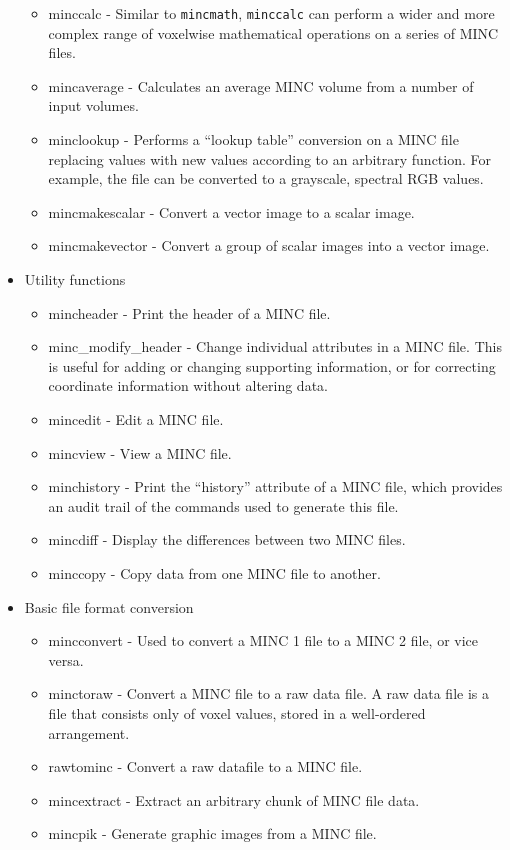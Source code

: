 \documentclass{article}
\begin{document}
\begin{itemize}
\begin{itemize}
\item minccalc - Similar to {\tt mincmath}, {\tt minccalc} can perform
a wider and more complex range of voxelwise mathematical operations
on a series of MINC files.
\item mincaverage - Calculates an average MINC volume from a number of
input volumes.
\item minclookup - Performs a ``lookup table'' conversion on a MINC file
replacing values with new values according to an arbitrary function.
For example, the file can be converted to a grayscale, spectral RGB values.
\item mincmakescalar - Convert a vector image to a scalar image.
\item mincmakevector - Convert a group of scalar images into a vector image.
\end{itemize}
\item Utility functions
\begin{itemize}
\item mincheader - Print the header of a MINC file.
\item minc\_modify\_header - Change individual attributes in a MINC file. This
is useful for adding or changing supporting information, or for correcting
coordinate information without altering data.
\item mincedit - Edit a MINC file.
\item mincview - View a MINC file.
\item minchistory - Print the ``history'' attribute of a MINC file, which
provides an audit trail of the commands used to generate this file.
\item mincdiff - Display the differences between two MINC files.
\item minccopy - Copy data from one MINC file to another.
\end{itemize}
\item Basic file format conversion
\begin{itemize}
\item mincconvert - Used to convert a MINC 1 file to a MINC 2 file, or
vice versa.
\item minctoraw - Convert a MINC file to a raw data file.  A raw data file
is a file that consists only of voxel values, stored in a well-ordered
arrangement.
\item rawtominc - Convert a raw datafile to a MINC file.
\item mincextract - Extract an arbitrary chunk of MINC file data.
\item mincpik - Generate graphic images from a MINC file.
\end{itemize}
\end{itemize}
\end{document}

